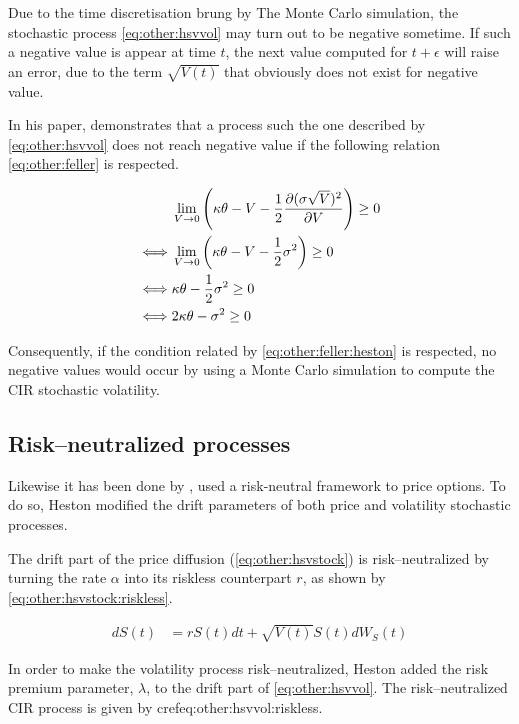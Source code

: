 \documentclass[12pt]{report}
\newcommand{\Bmsub}[1]{W_{#1}\left(t\right)}
\newcommand{\St}{S\left(t\right)}
\newcommand{\Vt}{V\left(t\right)}
\newcommand{\HSVstockriskless}{
  d\St &= r \St dt + \sqrt{\Vt} \St d \Bmsub{S}
}
\begin{document}
Due to the time discretisation brung by The Monte Carlo simulation, the stochastic process \ref{eq:other:hsvvol} may turn out to be negative sometime. If such a negative value is appear at time $t$, the next value computed for $t+\epsilon$ will raise an error, due to the term $\sqrt{V(t)}$ that obviously does not exist for negative value.

In his paper, \citet{feller1951} demonstrates that a process such the one described by \cref{eq:other:hsvvol} does not reach negative value if the following relation \ref{eq:other:feller} is respected.

\begin{align}
  &\lim_{V\to 0} \left( \kappa \theta - V - \frac{1}{2} \frac{\partial(\sigma \sqrt{V})^2}{\partial V} \right) \geq 0 \label{eq:other:feller} \\
  \iff &\lim_{V\to 0} \left( \kappa \theta - V - \frac{1}{2} \sigma^2 \right) \geq 0 \notag \\
  \iff &\kappa \theta  - \frac{1}{2} \sigma^2  \geq 0 \notag \\
  \iff & 2 \kappa \theta  - \sigma^2  \geq 0 \label{eq:other:feller:heston}
\end{align}

Consequently, if the condition related by \cref{eq:other:feller:heston} is respected, no negative values would occur by using a Monte Carlo simulation to compute the CIR stochastic volatility.

\subsection{Risk--neutralized processes}
\label{sub:other:heston:risk}

Likewise it has been done by \citet{bs}, \citet{heston1993} used a risk-neutral framework to price options.
To do so, Heston modified the drift parameters of both price and volatility stochastic processes.

The drift part of the price diffusion (\cref{eq:other:hsvstock}) is risk--neutralized by turning the rate $\alpha$ into its riskless counterpart $r$, as shown by \cref{eq:other:hsvstock:riskless}.

\begin{align}
    \HSVstockriskless \label{eq:other:hsvstock:riskless}
\end{align}

In order to make the volatility process risk--neutralized, Heston added the risk premium parameter, $\lambda$, to the drift part of \cref{eq:other:hsvvol}. The risk--neutralized CIR process is given by cref{eq:other:hsvvol:riskless}.
\end{document}

